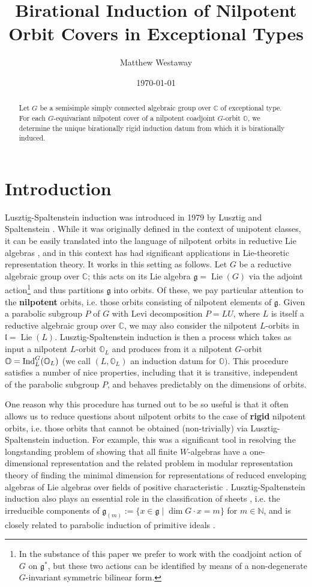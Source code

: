 \documentclass[11pt]{amsart}
\title{Birational Induction of Nilpotent Orbit Covers in Exceptional Types}
\author{Matthew Westaway}
\date{\today}
\newcommand{\C}{{\mathbb C}}
\renewcommand{\O}{{\mathbb O}}
\newcommand{\N}{{\mathbb N}}
\newcommand{\g}{{\mathfrak g}}
\renewcommand{\l}{{\mathfrak l}}
\newcommand{\Lie}{\operatorname{Lie}}
\newcommand{\Ind}{{{\mbox{\rm Ind}}}}
\numberwithin{equation}{section}
\begin{document}
	
	\begin{abstract}
		Let $G$ be a semisimple simply connected algebraic group over $\C$ of exceptional type. For each $G$-equivariant nilpotent cover of a nilpotent coadjoint $G$-orbit $\O$, we determine the unique birationally rigid induction datum from which it is birationally induced.
	\end{abstract}
	
	\maketitle
	
	\section{Introduction}\label{s: Intro}
	
	Lusztig-Spaltenstein induction was introduced in 1979 by Lusztig and Spaltenstein \cite{LS}. While it was originally defined in the context of unipotent classes, it can be easily translated into the language of nilpotent orbits in reductive Lie algebras \cite{CM}, and in this context has had significant applications in Lie-theoretic representation theory. It works in this setting as follows. Let $G$ be a reductive algebraic group over $\C$; this acts on its Lie algebra $\g=\Lie(G)$ via the adjoint action\footnote{In the substance of this paper we prefer to work with the coadjoint action of $G$ on $\g^{*}$, but these two actions can be identified by means of a non-degenerate $G$-invariant symmetric bilinear form.} and thus partitions $\g$ into orbits. Of these, we pay particular attention to the {\bf nilpotent} orbits, i.e. those orbits consisting of nilpotent elements of $\g$. Given a parabolic subgroup $P$ of $G$ with Levi decomposition $P=LU$, where $L$ is itself a reductive algebraic group over $\C$, we may also consider the nilpotent $L$-orbits in $\l=\Lie(L)$. Lusztig-Spaltenstein induction is then a process which takes as input a nilpotent $L$-orbit $\O_L$ and produces from it a nilpotent $G$-orbit $\O=\Ind_L^G(\O_L)$ (we call $(L,\O_L)$ an induction datum for $\O)$. This procedure satisfies a number of nice properties, including that it is transitive, independent of the parabolic subgroup $P$, and behaves predictably on the dimensions of orbits.
	
	One reason why this procedure has turned out to be so useful is that it often allows us to reduce questions about nilpotent orbits to the case of {\bf rigid} nilpotent orbits, i.e. those orbits that cannot be obtained (non-trivially) via Lusztig-Spaltenstein induction. For example, this was a significant tool in resolving the longstanding problem of showing that all finite $W$-algebras have a one-dimensional representation \cite{LoPI, Pr10,PrMF} and the related problem in modular representation theory of finding the minimal dimension for representations of reduced enveloping algebras of Lie algebras over fields of positive characteristic \cite{Pr1,PT2}. Lusztig-Spaltenstein induction also plays an essential role in the classification of sheets \cite{Bo}, i.e. the irreducible components of $\g_{(m)}:=\{x\in\g\mid \dim G\cdot x=m\}$ for $m\in\N$, and is closely related to parabolic induction of primitive ideals \cite{BJ}.
	
\end{document}
